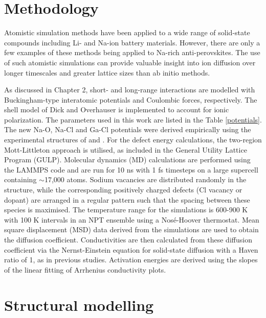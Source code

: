 \documentclass[12pt]{report}
\begin{document}
\section{Methodology}

Atomistic simulation methods have been applied to a wide range of solid-state compounds including Li- and Na-ion battery materials.\cite{clarke2021, islam2014, deng2018, tapia2018, symington2020}
However, there are only a few examples\cite{dawson2018c, li2021} of these methods being applied to Na-rich anti-perovskites.
The use of such atomistic simulations can provide valuable insight into ion diffusion over longer timescales and greater lattice sizes than ab initio methods.  

As discussed in Chapter 2, short- and long-range interactions are modelled with Buckingham-type interatomic potentials and Coulombic forces, respectively.\cite{catlow1997} 
The shell model of Dick and Overhauser\cite{dick1958} is implemented to account for ionic polarization. 
The parameters used in this work are listed in the Table \ref{potentials}. 
The new Na-O, Na-Cl and Ga-Cl potentials were derived empirically using the experimental structures of  and . 
For the defect energy calculations, the two-region Mott-Littleton approach\cite{mott1938} is utilised, as included in the General Utility Lattice Program (GULP).\cite{gale2003} 
Molecular dynamics (MD) calculations are performed using the LAMMPS code\cite{plimpton1995} and are run for 10 ns with 1 fs timesteps on a large supercell containing $\mathrm{\sim}$17,000 atoms. 
Sodium vacancies are distributed randomly in the structure, while the corresponding positively charged defects (Cl vacancy or dopant) are arranged in a regular pattern such that the spacing between these species is maximised. 
The temperature range for the simulations is 600-900 K with 100 K intervals in an NPT ensemble using a Nosé-Hoover thermostat.\cite{evans1985}
Mean square displacement (MSD) data derived from the simulations are used to obtain the diffusion coefficient. 
Conductivities are then calculated from these diffusion coefficient via the Nernst-Einstein equation for solid-state diffusion\cite{mehrer2007} with a Haven ratio of 1, as in previous studies.\cite{clarke2021, dawson2018c}
Activation energies are derived using the slopes of the linear fitting of Arrhenius conductivity plots.  

\section{Structural modelling}
\end{document}
